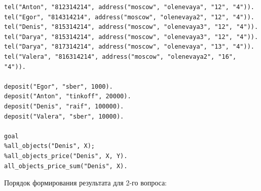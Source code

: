 \documentclass[12pt]{report}
\begin{document}
\begin{lstlisting}
tel("Anton", "812314214", address("moscow", "olenevaya", "12", "4")).
tel("Egor", "814314214", address("moscow", "olenevaya2", "12", "4")).
tel("Denis", "815314214", address("moscow", "olenevaya3", "12", "4")).
tel("Darya", "815314214", address("moscow", "olenevaya3", "12", "4")).
tel("Darya", "817314214", address("moscow", "olenevaya", "13", "4")).
tel("Valera", "816314214", address("moscow", "olenevaya2", "16", "4")).

deposit("Egor", "sber", 1000).
deposit("Anton", "tinkoff", 20000).
deposit("Denis", "raif", 100000).
deposit("Valera", "sber", 10000).

goal
%all_objects("Denis", X);
%all_objects_price("Denis", X, Y).
all_objects_price_sum("Denis", X).
\end{lstlisting}

\pagebreak
Порядок формирования результата для 2-го вопроса:
\end{document}
